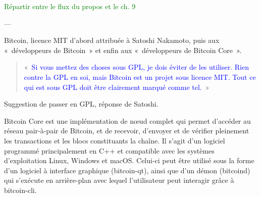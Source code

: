 \textcolor{green}{Répartir entre le flux du propos et le ch. 9}


---

Bitcoin, licence MIT d'abord attribuée à Satoshi Nakamoto, puis aux «~développeurs de Bitcoin~» et enfin aux «~développeurs de Bitcoin Core~».


\begin{quote}
«~\textcolor{blue}{Si vous mettez des choses sous GPL, je dois éviter de les utiliser. Rien contre la GPL en soi, mais Bitcoin est un projet sous licence MIT. Tout ce qui est sous GPL doit être clairement marqué comme tel.}~»
\end{quote} %



Suggestion de passer en GPL, réponse de Satoshi.

%
%
%


Bitcoin Core est une implémentation de nœud complet qui permet d'accéder au réseau pair-à-pair de Bitcoin, et de recevoir, d'envoyer et de vérifier pleinement les transactions et les blocs constituants la chaîne. Il s'agit d'un logiciel programmé principalement en C++ et compatible avec les systèmes d'exploitation Linux, Windows et macOS. Celui-ci peut être utilisé sous la forme d'un logiciel à interface graphique (bitcoin-qt), ainsi que d'un démon (bitcoind) qui s'exécute en arrière-plan avec lequel l'utilisateur peut interagir grâce à bitcoin-cli.

